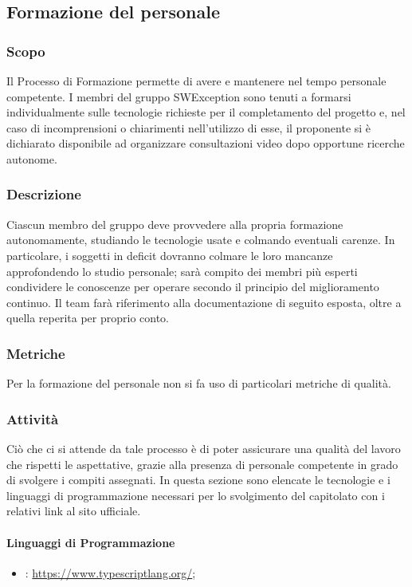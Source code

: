 \subsection{Formazione del personale} \label{_formazione}
\subsubsection{Scopo}
Il Processo di Formazione permette di avere e mantenere nel tempo personale competente. I membri del gruppo SWException sono tenuti a formarsi individualmente sulle tecnologie richieste per il completamento del progetto e, nel caso di incomprensioni o chiarimenti nell'utilizzo di esse, il proponente si è dichiarato disponibile ad organizzare consultazioni video dopo opportune ricerche autonome.
\subsubsection{Descrizione}
Ciascun membro del gruppo deve provvedere alla propria formazione autonomamente,
studiando le tecnologie usate e colmando eventuali carenze. In particolare, i soggetti in
deficit dovranno colmare le loro mancanze approfondendo lo studio personale; sarà compito
dei membri più esperti condividere le conoscenze per operare secondo il principio del miglioramento continuo.
Il team farà riferimento alla documentazione di seguito esposta, oltre a quella reperita per
proprio conto.

\subsubsection{Metriche}
Per la formazione del personale non si fa uso di particolari metriche di qualità.

\subsubsection{Attività}
Ciò che ci si attende da tale processo è di poter assicurare una qualità del lavoro che
rispetti le aspettative, grazie alla presenza di personale competente in grado di
svolgere i compiti assegnati. In questa sezione sono elencate le tecnologie e i linguaggi di programmazione necessari per lo svolgimento del capitolato con i relativi link al sito ufficiale.

\paragraph{Linguaggi di Programmazione}
\begin{itemize}
    \item \textbf{}: \url{https://www.typescriptlang.org/};
\end{itemize}
